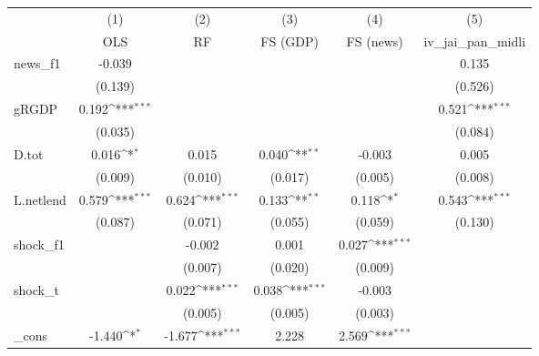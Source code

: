{
\def\sym#1{\ifmmode^{#1}\else\(^{#1}\)\fi}
\begin{tabular}{l*{5}{c}}
\toprule
            &\multicolumn{1}{c}{(1)}&\multicolumn{1}{c}{(2)}&\multicolumn{1}{c}{(3)}&\multicolumn{1}{c}{(4)}&\multicolumn{1}{c}{(5)}\\
            &\multicolumn{1}{c}{OLS}&\multicolumn{1}{c}{RF}&\multicolumn{1}{c}{FS (GDP)}&\multicolumn{1}{c}{FS (news)}&\multicolumn{1}{c}{iv\_jai\_pan\_midli}\\
\midrule
news\_f1     &      -0.039         &                     &                     &                     &       0.135         \\
            &     (0.139)         &                     &                     &                     &     (0.526)         \\
\addlinespace
gRGDP       &       0.192\sym{***}&                     &                     &                     &       0.521\sym{***}\\
            &     (0.035)         &                     &                     &                     &     (0.084)         \\
\addlinespace
D.tot       &       0.016\sym{*}  &       0.015         &       0.040\sym{**} &      -0.003         &       0.005         \\
            &     (0.009)         &     (0.010)         &     (0.017)         &     (0.005)         &     (0.008)         \\
\addlinespace
L.netlend   &       0.579\sym{***}&       0.624\sym{***}&       0.133\sym{**} &       0.118\sym{*}  &       0.543\sym{***}\\
            &     (0.087)         &     (0.071)         &     (0.055)         &     (0.059)         &     (0.130)         \\
\addlinespace
shock\_f1    &                     &      -0.002         &       0.001         &       0.027\sym{***}&                     \\
            &                     &     (0.007)         &     (0.020)         &     (0.009)         &                     \\
\addlinespace
shock\_t     &                     &       0.022\sym{***}&       0.038\sym{***}&      -0.003         &                     \\
            &                     &     (0.005)         &     (0.005)         &     (0.003)         &                     \\
\addlinespace
\_cons      &      -1.440\sym{*}  &      -1.677\sym{***}&       2.228         &       2.569\sym{***}&                     \\

\end{tabular}}
